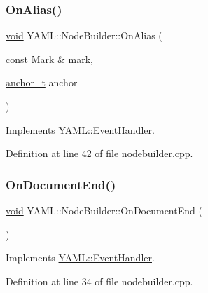 \subsubsection{\texorpdfstring{OnAlias()}{OnAlias()}}
{\footnotesize\ttfamily \mbox{\hyperlink{glad_8h_a950fc91edb4504f62f1c577bf4727c29}{void}} Y\+A\+M\+L\+::\+Node\+Builder\+::\+On\+Alias (\begin{DoxyParamCaption}\item[{const \mbox{\hyperlink{struct_y_a_m_l_1_1_mark}{Mark}} \&}]{mark,  }\item[{\mbox{\hyperlink{namespace_y_a_m_l_abeff1798814ae3402fc5665fdcad1de6}{anchor\+\_\+t}}}]{anchor }\end{DoxyParamCaption})\hspace{0.3cm}{\ttfamily [virtual]}}



Implements \mbox{\hyperlink{class_y_a_m_l_1_1_event_handler_a3459009c2aad49b3226e009fc06d33b6}{Y\+A\+M\+L\+::\+Event\+Handler}}.



Definition at line 42 of file nodebuilder.\+cpp.

\mbox{\label{class_y_a_m_l_1_1_node_builder_ae97951424f9c611ea4770dc9fb18f41b}} 
\subsubsection{\texorpdfstring{OnDocumentEnd()}{OnDocumentEnd()}}
{\footnotesize\ttfamily \mbox{\hyperlink{glad_8h_a950fc91edb4504f62f1c577bf4727c29}{void}} Y\+A\+M\+L\+::\+Node\+Builder\+::\+On\+Document\+End (\begin{DoxyParamCaption}{ }\end{DoxyParamCaption})\hspace{0.3cm}{\ttfamily [virtual]}}



Implements \mbox{\hyperlink{class_y_a_m_l_1_1_event_handler_afc0d547e87f9c1f63ba8087aabd7e34a}{Y\+A\+M\+L\+::\+Event\+Handler}}.



Definition at line 34 of file nodebuilder.\+cpp.

\mbox{\label{class_y_a_m_l_1_1_node_builder_a5c14e6ce94790880411dc26f60fc25c5}} 
